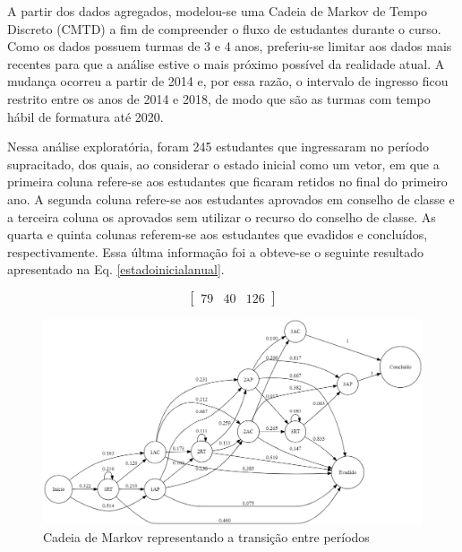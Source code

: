 \documentclass{article}
\begin{document}
A partir dos dados agregados, modelou-se uma Cadeia de Markov de Tempo Discreto (CMTD) a fim de compreender o fluxo de estudantes durante o curso. Como os dados possuem turmas de 3 e 4 anos, preferiu-se limitar aos dados mais recentes para que a análise estive o mais próximo possível da realidade atual. A mudança ocorreu a partir de 2014 e, por essa razão, o intervalo de ingresso ficou restrito entre os anos de 2014 e 2018, de modo que são as turmas com tempo hábil de formatura até 2020. 

Nessa análise exploratória, foram 245 estudantes que ingressaram no período supracitado, dos quais, ao considerar o estado inicial como um vetor, em que a primeira coluna refere-se aos estudantes que ficaram retidos no final do primeiro ano. A segunda coluna refere-se aos estudantes aprovados em conselho de classe e a terceira coluna os aprovados sem utilizar o recurso do conselho de classe. As quarta e quinta colunas referem-se aos estudantes que evadidos e concluídos, respectivamente. Essa últma informação foi a  obteve-se o seguinte resultado apresentado na Eq. \ref{estadoinicialanual}.

\begin{equation}
\begin{bmatrix}
    79 & 40 & 126  
\end{bmatrix}
\label{estadoinicialanual}
\end{equation}

\begin{figure}[H]
\centering
\includegraphics[width=1\textwidth]{markovperiodos.png}
\caption{Cadeia de Markov representando a transição entre períodos}
\label{markovPeriodos}
\end{figure}
\end{document}
